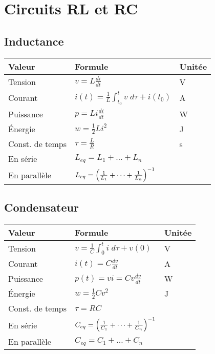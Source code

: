 \section{Circuits RL et RC}
\subsection{Inductance}
\centering
\begin{tabular}{lll}
Valeur & Formule & Unitée \\\hline\rule{0pt}{15pt}
Tension      & \(v=L\frac{di}{dt} \) & V \\[5pt]
Courant      & \(i(t)=\frac{1}{L}\int_{t_0}^{t} v \;d \tau + i(t_0) \) & A \\[5pt]
Puissance    & \(p=Li\frac{di}{dt} \) & W \\[5pt]
Énergie      & \(w=\frac{1}{2}Li^2\) & J \\[5pt]\hline\rule{0pt}{15pt}
Const. de temps & \(\tau = \frac{L}{R} \)& s\\[5pt]\hline\rule{0pt}{15pt}
En série     & \(L_{eq} = L_1 + \dots + L_n\) &   \\
En parallèle & \(L_{eq} = \qty(\frac{1}{L_1} + \dots + \frac{1}{L_n})^{-1} \) & 
\end{tabular}%

\subsection{Condensateur}
\centering
\begin{tabular}{lll}
Valeur & Formule & Unitée \\\hline\rule{0pt}{15pt}
Tension      & \(v=\frac{1}{C}\int_{0}^{t} i \;d \tau + v(0)  \) & V \\[10pt]
Courant      & \(i(t)=C\frac{dv}{dt}\) & A \\[5pt]
Puissance    & \(p(t)=vi=Cv\frac{dv}{dt} \) & W \\[5pt]
Énergie      & \(w=\frac{1}{2}Cv^2\) & J \\[5pt]\hline\rule{0pt}{10pt}
Const. de temps & \(\tau = RC\) & \\\hline\rule{0pt}{5pt}
En série     & \(C_{eq} = \qty(\frac{1}{C_1} + \dots + \frac{1}{C_n})^{-1} \) &   \\[10pt]
En parallèle & \(C_{eq} = C_1 + \dots + C_n\) &  
\end{tabular}%

